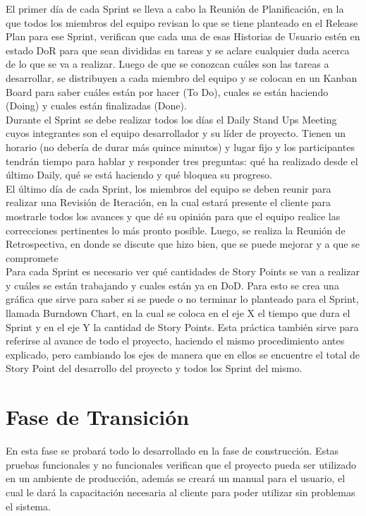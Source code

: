 El primer día de cada Sprint se lleva a cabo la Reunión de Planificación, en la que todos los miembros del equipo revisan lo que se tiene planteado en el Release Plan para ese Sprint, verifican que cada una de esas Historias de Usuario estén en estado DoR para que sean divididas en tareas y se aclare cualquier duda acerca de lo que se va a realizar. Luego de que se conozcan cuáles son las tareas a desarrollar, se distribuyen a cada miembro del equipo y se colocan en un Kanban Board para saber cuáles están por hacer (To Do), cuales se están haciendo (Doing) y cuales están finalizadas (Done).\\

Durante el Sprint se debe realizar todos los días el Daily Stand Ups Meeting cuyos integrantes son el equipo desarrollador y su líder de proyecto. Tienen un horario (no debería de durar más quince minutos) y lugar fijo y los participantes tendrán tiempo para hablar y responder tres preguntas: qué ha realizado desde el último Daily, qué se está haciendo y qué bloquea su progreso.\\

El último día de cada Sprint, los miembros del equipo se deben reunir para realizar una Revisión de Iteración, en la cual estará presente el cliente para mostrarle todos los avances y que dé su opinión para que el equipo realice las correcciones pertinentes lo más pronto posible. Luego, se realiza la Reunión de Retrospectiva, en donde se discute que hizo bien, que se puede mejorar y a que se compromete\\

Para cada Sprint es necesario ver qué cantidades de Story Points se van a realizar y cuáles se están trabajando y cuales están ya en DoD. Para esto se crea una gráfica que sirve para saber si se puede o no terminar lo planteado para el Sprint, llamada Burndown Chart, en la cual se coloca en el eje X el tiempo que dura el Sprint y en el eje Y la cantidad de Story Points. Esta práctica también sirve para referirse al avance de todo el proyecto, haciendo el mismo procedimiento antes explicado, pero cambiando los ejes de manera que en ellos se encuentre el total de Story Point del desarrollo del proyecto y todos los Sprint del mismo.

\section*{Fase de Transición}

En esta fase se probará todo lo desarrollado en la fase de construcción. Estas pruebas funcionales y no funcionales verifican que el proyecto pueda ser utilizado en un ambiente de producción, además se creará un manual para el usuario, el cual le dará la capacitación necesaria al cliente para poder utilizar sin problemas el sistema.


